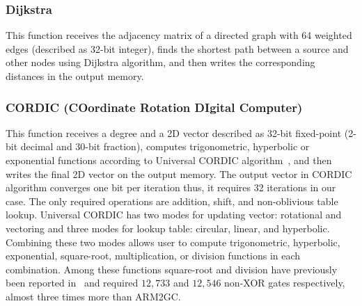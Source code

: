\subsubsection{Dijkstra}
This function receives the adjacency matrix of a directed graph with 64 weighted edges (described as 32-bit integer), finds the shortest path between a source and other nodes using Dijkstra algorithm, and then writes the corresponding distances in the output memory.

\subsubsection{CORDIC (COordinate Rotation DIgital Computer)}
This function receives a degree and a 2D vector described as 32-bit fixed-point (2-bit decimal and 30-bit fraction), computes trigonometric, hyperbolic or exponential functions according to Universal CORDIC algorithm~\cite{volder1959cordic}, and then writes the final 2D vector on the output memory.
The output vector in CORDIC algorithm converges one bit per iteration thus, it requires 32 iterations in our case.
The only required operations are addition, shift, and non-oblivious table lookup.
Universal CORDIC has two modes for updating vector: rotational and vectoring and three modes for lookup table: circular, linear, and hyperbolic.
Combining these two modes allows user to compute trigonometric, hyperbolic, exponential, square-root, multiplication, or division functions in each combination.
Among these functions square-root and division have previously been reported in~\cite{hussain2016privacy} and required $12,733$ and $12,546$ non-XOR gates respectively, almost three times more than ARM2GC.
